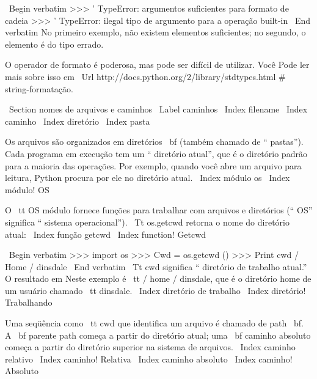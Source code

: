 \documentclass[10pt]{book}
\begin{document}
\begin {itemize}
{{{{{{{{{{\ Begin {verbatim}
>>> '%
TypeError: argumentos suficientes para formato de cadeia
>>> '%
TypeError: ilegal tipo de argumento para a operação built-in
\ End {verbatim}
%
No primeiro exemplo, não existem elementos suficientes; no
segundo, o elemento é do tipo errado.

O operador de formato é poderosa, mas pode ser difícil de utilizar. Você
Pode ler mais sobre isso em
\ Url {http://docs.python.org/2/library/stdtypes.html # string-formatação}.




\ Section {nomes de arquivos e caminhos}
\ Label {caminhos}
\ Index {filename}
\ Index {caminho}
\ Index {diretório}
\ Index {pasta}

Os arquivos são organizados em diretórios {\ bf} (também chamado de `` pastas'').
Cada programa em execução tem um `` diretório atual'', que é o
diretório padrão para a maioria das operações.  
Por exemplo, quando você abre um arquivo para leitura, Python procura por ele no
diretório atual.
\ Index {módulo os}
\ Index {módulo! OS}

O {\ tt OS} módulo fornece funções para trabalhar com arquivos e
diretórios (`` OS'' significa `` sistema operacional''). {\ Tt os.getcwd}
retorna o nome do diretório atual:
\ Index {função getcwd}
\ Index {function! Getcwd}

\ Begin {verbatim}
>>> import os
>>> Cwd = os.getcwd ()
>>> Print cwd
/ Home / dinsdale
\ End {verbatim}
%
{\ Tt cwd} significa `` diretório de trabalho atual.'' O resultado em
Neste exemplo é {\ tt / home / dinsdale}, que é o diretório home de um
usuário chamado {\ tt dinsdale}.
\ Index {diretório de trabalho}
\ Index {diretório! Trabalhando}

Uma seqüência como {\ tt cwd} que identifica um arquivo é chamado de {path \ bf}.
A {\ bf parente path} começa a partir do diretório atual;
uma {\ bf caminho absoluto} começa a partir do diretório superior na
sistema de arquivos.
\ Index {caminho relativo}
\ Index {caminho! Relativa}
\ Index {caminho absoluto}
\ Index {caminho! Absoluto}

}}}}}}}}}}
\end{itemize}
\end{document}
